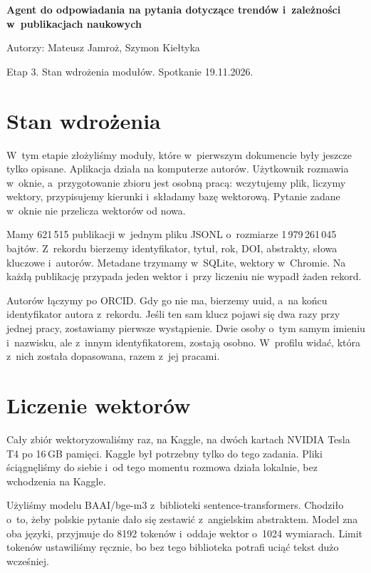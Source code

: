 \documentclass[11pt,a4paper]{article}
\begin{document}
\begin{center}
{\Large\bfseries Agent do odpowiadania na pytania dotyczące trendów i~zależności w~publikacjach naukowych\par}
\vspace{0.7em}
Autorzy: Mateusz Jamroż, Szymon Kiełtyka\par
\vspace{0.25em}
Etap 3. Stan wdrożenia modułów. Spotkanie 19.11.2026.
\end{center}

\vspace{0.4em}

\section*{Stan wdrożenia}

W~tym etapie złożyliśmy moduły, które w~pierwszym dokumencie były jeszcze tylko opisane. Aplikacja działa na komputerze autorów. Użytkownik rozmawia w~oknie, a~przygotowanie zbioru jest osobną pracą: wczytujemy plik, liczymy wektory, przypisujemy kierunki i~składamy bazę wektorową. Pytanie zadane w~oknie nie przelicza wektorów od nowa.

Mamy 621\,515 publikacji w~jednym pliku JSONL o~rozmiarze 1\,979\,261\,045 bajtów. Z~rekordu bierzemy identyfikator, tytuł, rok, DOI, abstrakty, słowa kluczowe i~autorów. Metadane trzymamy w~SQLite, wektory w~Chromie. Na każdą publikację przypada jeden wektor i~przy liczeniu nie wypadł żaden rekord.

Autorów łączymy po ORCID. Gdy go nie ma, bierzemy uuid, a~na końcu identyfikator autora z~rekordu. Jeśli ten sam klucz pojawi się dwa razy przy jednej pracy, zostawiamy pierwsze wystąpienie. Dwie osoby o~tym samym imieniu i~nazwisku, ale z~innym identyfikatorem, zostają osobno. W~profilu widać, która z~nich została dopasowana, razem z~jej pracami.

\section*{Liczenie wektorów}

Cały zbiór wektoryzowaliśmy raz, na Kaggle, na dwóch kartach NVIDIA Tesla T4 po 16\,GB pamięci. Kaggle był potrzebny tylko do tego zadania. Pliki ściągnęliśmy do siebie i~od tego momentu rozmowa działa lokalnie, bez wchodzenia na Kaggle.

Użyliśmy modelu BAAI/bge-m3 z~biblioteki sentence-transformers. Chodziło o~to, żeby polskie pytanie dało się zestawić z~angielskim abstraktem. Model zna oba języki, przyjmuje do 8192 tokenów i~oddaje wektor o~1024 wymiarach. Limit tokenów ustawiliśmy ręcznie, bo bez tego biblioteka potrafi uciąć tekst dużo wcześniej.
\end{document}
